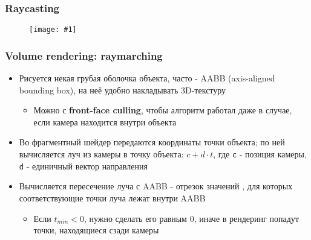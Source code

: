\documentclass{beamer}
\newcommand{\slideimage}[1]{
  \begin{figure}
    \begin{adjustbox}{width=\textwidth, totalheight=\textheight-2\baselineskip-2\baselineskip,keepaspectratio}
      \texttt{[image: \#1]}
    \end{adjustbox}
  \end{figure}
}
\begin{document}
\begin{frame}[fragile]
\frametitle{Raycasting}
\slideimage{raycasting.png}
\end{frame}

\begin{frame}[fragile]
\frametitle{Volume rendering: raymarching}
\begin{itemize}
\item Рисуется некая грубая оболочка объекта, часто - AABB (axis-aligned bounding box), на неё удобно накладывать 3D-текстуру
\begin{itemize}
\item Можно с \textbf{front-face culling}, чтобы алгоритм работал даже в случае, если камера находится внутри объекта
\end{itemize}
\pause
\item Во фрагментный шейдер передаются координаты точки объекта; по ней вычисляется луч из камеры в точку объекта: \begin{math}c + d\cdot t\end{math}, где \verb|c| - позиция камеры, \verb|d| - единичный вектор направления
\pause
\item Вычисляется пересечение луча с AABB - отрезок значений \begin{math}[t_{min}, t_{max}]\end{math}, для которых соответствующие точки луча лежат внутри AABB
\begin{itemize}
\item Если \begin{math}t_{min} < 0\end{math}, нужно сделать его равным 0, иначе в рендеринг попадут точки, находящиеся сзади камеры
\end{itemize}
\end{itemize}
\end{frame}
\end{document}
